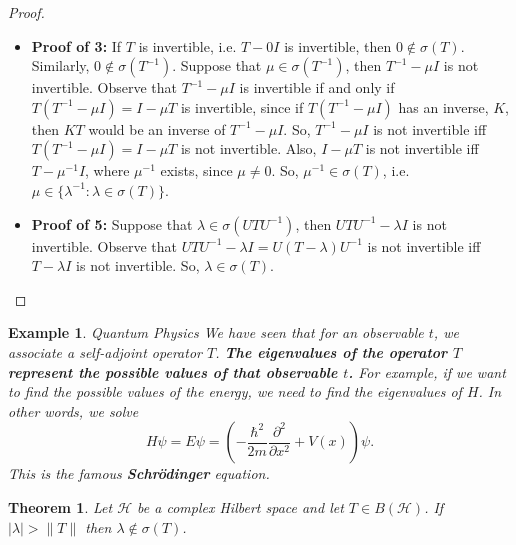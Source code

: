 \documentclass{beamer}
\newtheorem{thm}{Theorem}
\newtheorem{exm}{Example}
\begin{document}
    \begin{frame}{\subsecname}
      \begin{proof}
        \begin{itemize}
          \pause
        \item\textbf{Proof of 3:} If $T$ is invertible, i.e. $T-0I$ is invertible, then $0\notin\sigma(T)$. Similarly, $0\notin\sigma(T^{-1})$. Suppose that $\mu\in\sigma(T^{-1})$, then $T^{-1}-\mu I$ is not invertible. Observe that $T^{-1}-\mu I$ is invertible if and only if $T(T^{-1}-\mu I)=I-\mu T$ is invertible, since if $T(T^{-1}-\mu I)$ has an inverse, $K$, then $KT$ would be an inverse of $T^{-1}-\mu I$. So, $T^{-1}-\mu I$ is not invertible iff $T(T^{-1}-\mu I)=I-\mu T$ is not invertible. Also, $I-\mu T$ is not invertible iff $T-\mu^{-1}I$, where $\mu^{-1}$ exists, since $\mu\not=0$. So, $\mu^{-1}\in\sigma(T)$, i.e. $\mu\in\{\lambda^{-1}: \lambda\in\sigma(T)\}$.
          \pause

        \item\textbf{Proof of 5:} Suppose that $\lambda\in\sigma(UTU^{-1})$, then $UTU^{-1}-\lambda I$ is not invertible. Observe that $UTU^{-1}-\lambda I=U(T-\lambda)U^{-1}$ is not invertible iff $T-\lambda I$ is not invertible. So, $\lambda\in\sigma(T)$.
      \end{itemize}
    \end{proof}
  \end{frame}

  \begin{frame}{\subsecname}
    \begin{exm}{Quantum Physics}
    We have seen that for an observable $t$, we associate a self-adjoint operator $T$.\textbf{ The eigenvalues of the operator $T$ represent the possible values of that observable $t$.}
    \pause
    For example, if we want to find the possible values of the energy, we need to find the eigenvalues of $H$. In other words, we solve
    \[
    H\psi=E\psi=\left(-\frac{\hbar^2}{2m}\frac{\partial^2}{\partial x^2}+V(x)\right)\psi.
    \]
    \pause
    This is the famous \textbf{Schrödinger} equation.
    \end{exm}
  \end{frame}

  \begin{frame}{\subsecname}
    \begin{thm} \label{SpectIsBd}
    Let $\mathcal{H}$ be a complex Hilbert space and let $T \in B(\mathcal{H})$. If $|\lambda|>\|T\|$ then $\lambda \notin \sigma(T)$.
    \end{thm}
  \end{frame}
\end{document}
